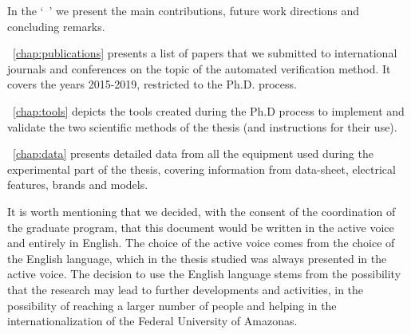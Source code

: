 In the `~' we present the main contributions, future work directions and concluding remarks.

~\autoref{chap:publications} presents a list of papers that we submitted to international journals and conferences on the topic of the automated verification method. It covers the years 2015-2019, restricted to the Ph.D. process.

~\autoref{chap:tools} depicts the tools created during the Ph.D process to implement and validate the two scientific methods of the thesis (and instructions for their use).

~\autoref{chap:data} presents detailed data from all the equipment used during the experimental part of the thesis, covering information from data-sheet, electrical features, brands and models. 

It is worth mentioning that we decided, with the consent of the coordination of the graduate program, that this document would be written in the active voice and entirely in English. The choice of the active voice comes from the choice of the English language, which in the thesis studied was always presented in the active voice. The decision to use the English language stems from the possibility that the research may lead to further developments and activities,  in the possibility of reaching a larger number of people and helping in the internationalization of the Federal University of Amazonas.